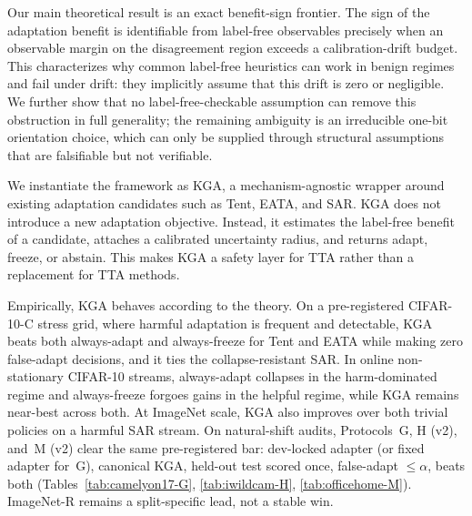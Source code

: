 \documentclass[conference]{IEEEtran}
\theoremstyle{plain}
\theoremstyle{definition}
\begin{document}
Our main theoretical result is an exact benefit-sign frontier. The sign of the
adaptation benefit is identifiable from label-free observables precisely when an
observable margin on the disagreement region exceeds a calibration-drift budget.
This characterizes why common label-free heuristics can work in benign regimes and
fail under drift: they implicitly assume that this drift is zero or negligible. We
further show that no label-free-checkable assumption can remove this obstruction in
full generality; the remaining ambiguity is an irreducible one-bit orientation
choice, which can only be supplied through structural assumptions that are
falsifiable but not verifiable.

We instantiate the framework as \textsc{KGA}, a mechanism-agnostic wrapper around
existing adaptation candidates such as Tent, EATA, and SAR. \textsc{KGA} does not
introduce a new adaptation objective. Instead, it estimates the label-free benefit
of a candidate, attaches a calibrated uncertainty radius, and returns adapt,
freeze, or abstain. This makes \textsc{KGA} a safety layer for TTA rather than a
replacement for TTA methods.

Empirically, \textsc{KGA} behaves according to the theory. On a pre-registered
CIFAR-10-C stress grid, where harmful adaptation is frequent and detectable,
\textsc{KGA} beats both always-adapt and always-freeze for Tent and EATA while
making zero false-adapt decisions, and it ties the collapse-resistant SAR. In
online non-stationary CIFAR-10 streams, always-adapt collapses in the harm-dominated
regime and always-freeze forgoes gains in the helpful regime, while \textsc{KGA}
remains near-best across both. At ImageNet scale, \textsc{KGA} also improves over
both trivial policies on a harmful SAR stream. On natural-shift audits, Protocols~G,
H (v2), and~M (v2) clear the same pre-registered bar: dev-locked adapter (or fixed
adapter for~G), canonical \textsc{KGA}, held-out test scored once, false-adapt
$\le\alpha$, beats both (Tables~\ref{tab:camelyon17-G}, \ref{tab:iwildcam-H},
\ref{tab:officehome-M}). ImageNet-R remains a split-specific lead, not a stable win.
\end{document}
